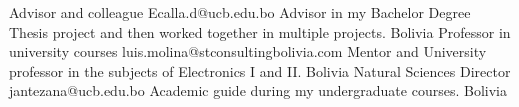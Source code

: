 


\begin{cvreferences}
  {Advisor and colleague}
  {Ecalla.d@ucb.edu.bo}
  {Advisor in my Bachelor Degree Thesis project and then worked
  together in multiple projects.}
  {Bolivia}
  {Professor in university courses}
  {luis.molina@stconsultingbolivia.com}
  {Mentor and University professor in the subjects of Electronics I
  and II.}
  {Bolivia}
  {Natural Sciences Director}
  {jantezana@ucb.edu.bo}
  {Academic guide during my undergraduate courses.}
  {Bolivia}
\end{cvreferences}